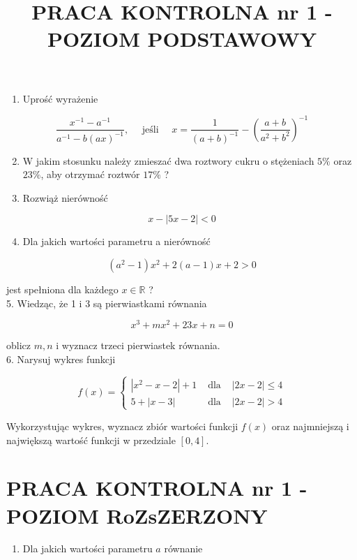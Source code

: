 \documentclass[10pt]{article}
\title{PRACA KONTROLNA nr 1 - POZIOM PODSTAWOWY }
\author{}
\date{}
\begin{document}
\maketitle
\begin{enumerate}
  \item Uprość wyrażenie
\end{enumerate}

$$
\frac{x^{-1}-a^{-1}}{a^{-1}-b(a x)^{-1}}, \quad \text { jeśli } \quad x=\frac{1}{(a+b)^{-1}}-\left(\frac{a+b}{a^{2}+b^{2}}\right)^{-1}
$$

\begin{enumerate}
  \setcounter{enumi}{1}
  \item W jakim stosunku należy zmieszać dwa roztwory cukru o stężeniach $5 \%$ oraz $23 \%$, aby otrzymać roztwór $17 \%$ ?
  \item Rozwiąż nierówność
\end{enumerate}

$$
x-|5 x-2|<0
$$

\begin{enumerate}
  \setcounter{enumi}{3}
  \item Dla jakich wartości parametru a nierówność
\end{enumerate}

$$
\left(a^{2}-1\right) x^{2}+2(a-1) x+2>0
$$

jest spełniona dla każdego $x \in \mathbb{R}$ ?\\
5. Wiedząc, że 1 i 3 są pierwiastkami równania

$$
x^{3}+m x^{2}+23 x+n=0
$$

oblicz $m, n$ i wyznacz trzeci pierwiastek równania.\\
6. Narysuj wykres funkcji

$$
f(x)=\left\{\begin{array}{lll}
\left|x^{2}-x-2\right|+1 & \text { dla } & |2 x-2| \leqslant 4 \\
5+|x-3| & \text { dla } & |2 x-2|>4
\end{array}\right.
$$

Wykorzystując wykres, wyznacz zbiór wartości funkcji $f(x)$ oraz najmniejszą i największą wartość funkcji w przedziale $[0,4]$.

\section*{PRACA KONTROLNA nr 1 - POZIOM RoZsZERZONY}
\begin{enumerate}
  \item Dla jakich wartości parametru $a$ równanie
\end{enumerate}
\end{document}
